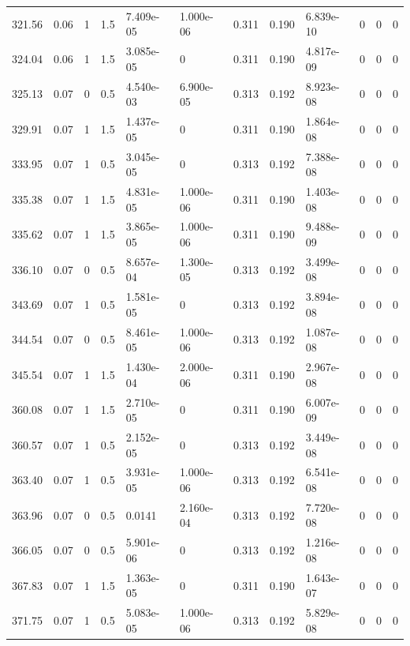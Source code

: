 \documentclass[preview]{standalone}
\begin{document}
{{{\begin{tabular}{L{1.2cm}C{1.2cm} C{0.3cm}C{0.5cm} C{1.4cm}C{1.4cm} C{1.4cm}C{1.4cm} C{1.6cm}C{1.6cm} C{1.6cm}C{1.6cm}}
  321.56  &  0.06  & 1     & 1.5 &  7.409e-05  & 1.000e-06  &  0.311&   0.190& 6.839e-10 & 0   &  0 & 0  \\ 
  324.04  &  0.06  & 1     & 1.5 &  3.085e-05  & 0  &  0.311&   0.190& 4.817e-09 & 0   &  0 & 0  \\ 
  325.13  &  0.07  & 0     & 0.5 &  4.540e-03  & 6.900e-05  &  0.313&   0.192& 8.923e-08 & 0   &  0 & 0  \\ 
  329.91  &  0.07  & 1     & 1.5 &  1.437e-05  & 0  &  0.311&   0.190& 1.864e-08 & 0   &  0 & 0  \\ 
  333.95  &  0.07  & 1     & 0.5 &  3.045e-05  & 0  &  0.313&   0.192& 7.388e-08 & 0   &  0 & 0  \\ 
  335.38  &  0.07  & 1     & 1.5 &  4.831e-05  & 1.000e-06  &  0.311&   0.190& 1.403e-08 & 0   &  0 & 0  \\ 
  335.62  &  0.07  & 1     & 1.5 &  3.865e-05  & 1.000e-06  &  0.311&   0.190& 9.488e-09 & 0   &  0 & 0  \\ 
  336.10  &  0.07  & 0     & 0.5 &  8.657e-04  & 1.300e-05  &  0.313&   0.192& 3.499e-08 & 0   &  0 & 0  \\ 
  343.69  &  0.07  & 1     & 0.5 &  1.581e-05  & 0  &  0.313&   0.192& 3.894e-08 & 0   &  0 & 0  \\ 
  344.54  &  0.07  & 0     & 0.5 &  8.461e-05  & 1.000e-06  &  0.313&   0.192& 1.087e-08 & 0   &  0 & 0  \\ 
  345.54  &  0.07  & 1     & 1.5 &  1.430e-04  & 2.000e-06  &  0.311&   0.190& 2.967e-08 & 0   &  0 & 0  \\ 
  360.08  &  0.07  & 1     & 1.5 &  2.710e-05  & 0  &  0.311&   0.190& 6.007e-09 & 0   &  0 & 0  \\ 
  360.57  &  0.07  & 1     & 0.5 &  2.152e-05  & 0  &  0.313&   0.192& 3.449e-08 & 0   &  0 & 0  \\ 
  363.40  &  0.07  & 1     & 0.5 &  3.931e-05  & 1.000e-06  &  0.313&   0.192& 6.541e-08 & 0   &  0 & 0  \\ 
  363.96  &  0.07  & 0     & 0.5 &  0.0141  & 2.160e-04  &  0.313&   0.192& 7.720e-08 & 0   &  0 & 0  \\ 
  366.05  &  0.07  & 0     & 0.5 &  5.901e-06  & 0  &  0.313&   0.192& 1.216e-08 & 0   &  0 & 0  \\ 
  367.83  &  0.07  & 1     & 1.5 &  1.363e-05  & 0  &  0.311&   0.190& 1.643e-07 & 0   &  0 & 0  \\ 
  371.75  &  0.07  & 1     & 0.5 &  5.083e-05  & 1.000e-06  &  0.313&   0.192& 5.829e-08 & 0   &  0 & 0  \\ 

\end{tabular}}}}
\end{document}
